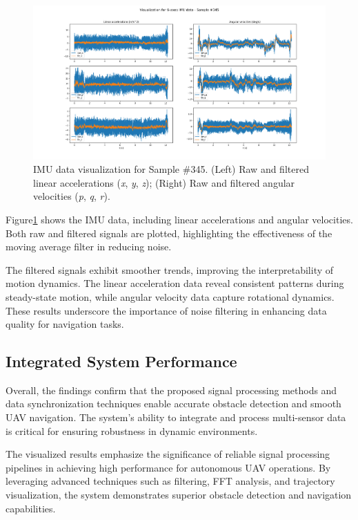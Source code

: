 \documentclass[12pt,a4paper]{article}
\begin{document}
\begin{figure}[h!]
    \centering
    \includegraphics[width=\textwidth]{test_imu_345.png}
    \caption{IMU data visualization for Sample \#345. (Left) Raw and filtered linear accelerations (\textit{x}, \textit{y}, \textit{z}); (Right) Raw and filtered angular velocities (\textit{p}, \textit{q}, \textit{r}).}
    \label{fig:IMU}
\end{figure}

Figure\ref{fig:IMU} shows the IMU data, including linear accelerations and angular velocities. Both raw and filtered signals are plotted, highlighting the effectiveness of the moving average filter in reducing noise. 

The filtered signals exhibit smoother trends, improving the interpretability of motion dynamics. The linear acceleration data reveal consistent patterns during steady-state motion, while angular velocity data capture rotational dynamics. These results underscore the importance of noise filtering in enhancing data quality for navigation tasks.

\subsection{Integrated System Performance}

Overall, the findings confirm that the proposed signal processing methods and data synchronization techniques enable accurate obstacle detection and smooth UAV navigation. The system's ability to integrate and process multi-sensor data is critical for ensuring robustness in dynamic environments.


The visualized results emphasize the significance of reliable signal processing pipelines in achieving high performance for autonomous UAV operations. By leveraging advanced techniques such as filtering, FFT analysis, and trajectory visualization, the system demonstrates superior obstacle detection and navigation capabilities.
\end{document}
